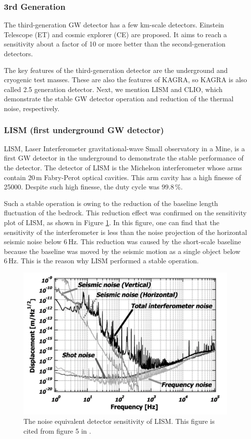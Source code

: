 \subsubsection{3rd Generation}
The third-generation GW detector has a few km-scale detectors. Einstein Telescope (ET) and cosmic explorer (CE) \cite{abbott2017exploring} are proposed. It aims to reach a sensitivity about a factor of 10 or more better than the second-generation detectors.

The key features of the third-generation detector are the underground and cryogenic test masses. These are also the features of KAGRA, so KAGRA is also called 2.5 generation detector. Next, we mention LISM and CLIO, which demonstrate the stable GW detector operation and reduction of the thermal noise, respectively.


\subsubsection{LISM (first underground GW detector)} \label{sec:141_lism}
LISM, Laser Interferometer gravitational-wave Small observatory in a Mine, is a first GW detector in the underground to demonstrate the stable performance of the detector. The detector of LISM is the Michelson interferometer whose arms contain $20\,\mathrm{m}$ Fabry-Perot optical cavities. This arm cavity has a high finesse of 25000. Despite such high finesse, the duty cycle was $99.8\,\%$.

Such a stable operation is owing to the reduction of the baseline length fluctuation of the bedrock. This reduction effect was confirmed on the sensitivity plot of LISM, as shown in Figure \ref{img:img122}. In this figure, one can find that the sensitivity of the interferometer is less than the noise projection of the horizontal seismic noise below $6\,\mathrm{Hz}$. This reduction was caused by the short-scale baseline because the baseline was moved by the seismic motion as a single object below $6\,\mathrm{Hz}$. This is the reason why LISM performed a stable operation. 
\begin{figure}[h]
  \begin{center}   
    \includegraphics[width=11cm]{./img_chap1/img122.png}
    \caption{The noise equivalent detector sensitivity of LISM. This figure is cited from figure 5 in \cite{sato2004ultrastable}. } \label{img:img122}
  \end{center}
\end{figure}


